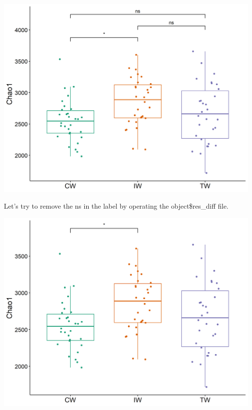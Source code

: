 \documentclass[
]{book}
\newenvironment{Shaded}{\begin{snugshade}}{\end{snugshade}}
\newcommand{\AttributeTok}[1]{\textcolor[rgb]{0.77,0.63,0.00}{#1}}
\newcommand{\DecValTok}[1]{\textcolor[rgb]{0.00,0.00,0.81}{#1}}
\newcommand{\FunctionTok}[1]{\textcolor[rgb]{0.00,0.00,0.00}{#1}}
\newcommand{\NormalTok}[1]{#1}
\newcommand{\OtherTok}[1]{\textcolor[rgb]{0.56,0.35,0.01}{#1}}
\newcommand{\SpecialCharTok}[1]{\textcolor[rgb]{0.00,0.00,0.00}{#1}}
\newcommand{\StringTok}[1]{\textcolor[rgb]{0.31,0.60,0.02}{#1}}
\begin{document}
\begin{center}\includegraphics[width=600px]{Images/plot_alpha_wilcox} \end{center}

Let's try to remove the ns in the label by operating the object\$res\_diff file.

\begin{Shaded}
\end{Shaded}

\begin{center}\includegraphics[width=600px]{Images/plot_alpha_wilcox_nons} \end{center}
\end{document}
